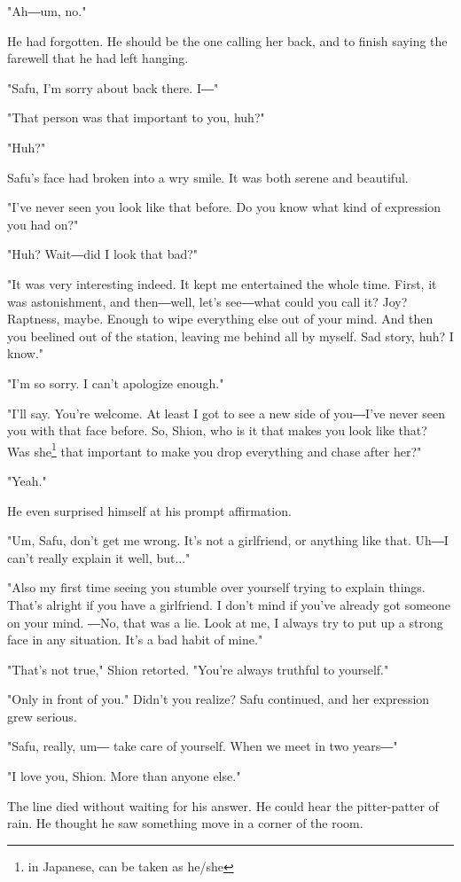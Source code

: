 "Ah―um, no."

He had forgotten. He should be the one calling her back, and to finish
saying the farewell that he had left hanging.

"Safu, I'm sorry about back there. I―"

"That person was that important to you, huh?"

"Huh?"

Safu's face had broken into a wry smile. It was both serene and
beautiful.

"I've never seen you look like that before. Do you know what kind of
expression you had on?"

"Huh? Wait―did I look that bad?"

"It was very interesting indeed. It kept me entertained the whole time.
First, it was astonishment, and then―well, let's see―what could you call
it? Joy? Raptness, maybe. Enough to wipe everything else out of your
mind. And then you beelined out of the station, leaving me behind all by
myself. Sad story, huh? I know."

"I'm so sorry. I can't apologize enough."

"I'll say. You're welcome. At least I got to see a new side of you―I've
never seen you with that face before. So, Shion, who is it that makes
you look like that? Was she\footnote{in Japanese, can be taken as he/she} that important to make you drop everything
and chase after her?"

"Yeah."

He even surprised himself at his prompt affirmation.

"Um, Safu, don't get me wrong. It's not a girlfriend, or anything like
that. Uh―I can't really explain it well, but..."

"Also my first time seeing you stumble over yourself trying to explain
things. That's alright if you have a girlfriend. I don't mind if you've
already got someone on your mind. ―No, that was a lie. Look at me, I
always try to put up a strong face in any situation. It's a bad habit of
mine."

"That's not true," Shion retorted. "You're always truthful to yourself."

"Only in front of you." Didn't you realize? Safu continued, and her
expression grew serious.

"Safu, really, um― take care of yourself. When we meet in two years―"

"I love you, Shion. More than anyone else."

The line died without waiting for his answer. He could hear the
pitter-patter of rain. He thought he saw something move in a corner of
the room.

